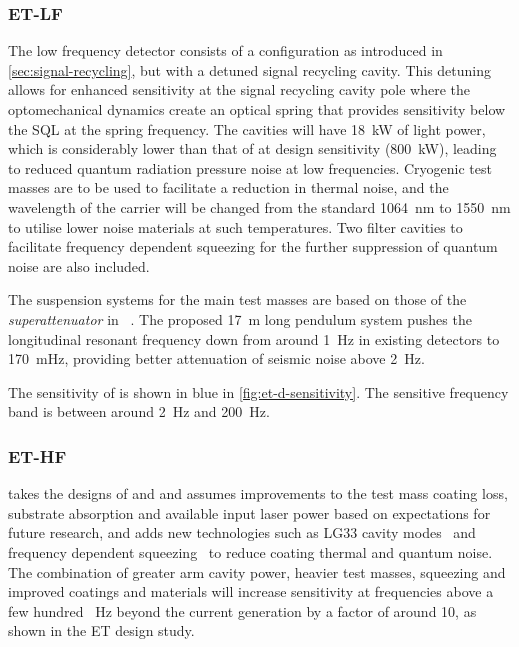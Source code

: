 \subsubsection{ET-LF}
The low frequency detector consists of a \DRFPMI{} configuration as introduced in \cref{sec:signal-recycling}, but with a detuned signal recycling cavity. This detuning allows for enhanced sensitivity at the signal recycling cavity pole where the optomechanical dynamics create an optical spring that provides sensitivity below the \gls{SQL} at the spring frequency. The cavities will have \SI{18}{\kilo\watt} of light power, which is considerably lower than that of \ALIGO{} at design sensitivity (\SI{800}{\kilo\watt}), leading to reduced quantum radiation pressure noise at low frequencies. Cryogenic test masses are to be used to facilitate a reduction in thermal noise, and the wavelength of the carrier will be changed from the standard \SI{1064}{\nano\meter} to \SI{1550}{\nano\meter} to utilise lower noise materials at such temperatures. Two filter cavities to facilitate frequency dependent squeezing for the further suppression of quantum noise are also included.

The suspension systems for the main test masses are based on those of the \emph{superattenuator} in \VIRGO{}~\cite{Acernese2010}. The proposed \SI{17}{\meter} long pendulum system pushes the longitudinal resonant frequency down from around \SI{1}{\hertz} in existing detectors to \SI{170}{\milli\hertz}, providing better attenuation of seismic noise above \SI{2}{\hertz}.

The sensitivity of \ETLF{} is shown in blue in \cref{fig:et-d-sensitivity}. The sensitive frequency band is between around \SI{2}{\hertz} and \SI{200}{\hertz}.

\subsubsection{ET-HF}
\ETHF{} takes the designs of \ALIGO{} and \AVIRGO{} and assumes improvements to the test mass coating loss, substrate absorption and available input laser power based on expectations for future research, and adds new technologies such as LG33 cavity modes~\cite{Carbone2013} and frequency dependent squeezing~\cite{Kimble2001} to reduce coating thermal and quantum noise. The combination of greater arm cavity power, heavier test masses, squeezing and improved coatings and materials will increase sensitivity at frequencies above a few hundred \SI{}{\hertz} beyond the current generation by a factor of around \num{10}, as shown in the \gls{ET} design study.

